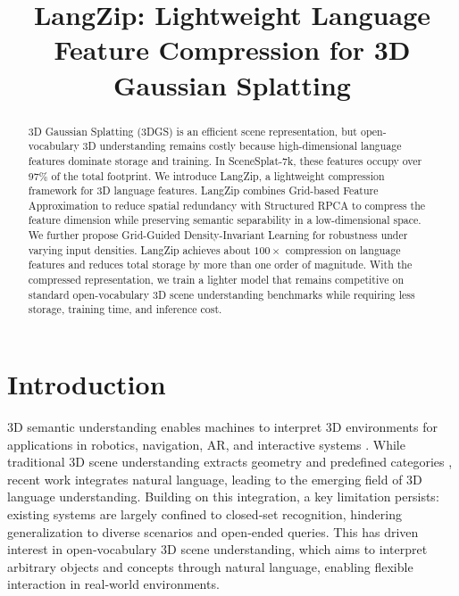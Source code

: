 \documentclass{article}
\title{LangZip: Lightweight Language Feature Compression for 3D Gaussian Splatting}
\begin{document}
\maketitle

\begin{abstract}
  3D Gaussian Splatting (3DGS) is an efficient scene representation, but open-vocabulary 3D understanding remains costly because high-dimensional language features dominate storage and training. In SceneSplat-7k, these features occupy over 97\% of the total footprint. We introduce LangZip, a lightweight compression framework for 3D language features. LangZip combines Grid-based Feature Approximation to reduce spatial redundancy with Structured RPCA to compress the feature dimension while preserving semantic separability in a low-dimensional space. We further propose Grid-Guided Density-Invariant Learning for robustness under varying input densities. LangZip achieves about $100\times$ compression on language features and reduces total storage by more than one order of magnitude. With the compressed representation, we train a lighter model that remains competitive on standard open-vocabulary 3D scene understanding benchmarks while requiring less storage, training time, and inference cost.
\end{abstract}


\section{Introduction}
\label{sec:intro}
3D semantic understanding enables machines to interpret 3D environments for applications in robotics, navigation, AR, and interactive systems \cite{rosinol20203d,tian2024drivevlm,zhou2020cylinder3d}. While traditional 3D scene understanding extracts geometry and predefined categories \cite{dai2017scannet,yeshwanth2023scannet++,gupta2015indoor}, recent work integrates natural language\cite{jiang2024open}, leading to the emerging field of 3D language understanding. 
Building on this integration, a key limitation persists: existing systems are largely confined to closed‑set recognition, hindering generalization to diverse scenarios and open‑ended queries. This has driven interest in open‑vocabulary 3D scene understanding, which aims to interpret arbitrary objects and concepts through natural language, enabling flexible interaction in real‑world environments.
\end{document}
